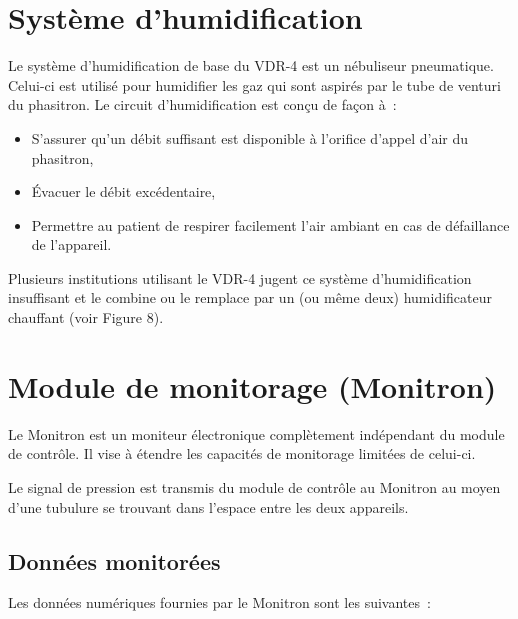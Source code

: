 \section{Système d’humidification}

Le système d’humidification de base du VDR-4 est un nébuliseur pneumatique. Celui-ci est utilisé pour humidifier les gaz qui sont aspirés par le tube de venturi du phasitron. Le circuit d’humidification est conçu de façon à :

\begin{itemize}
	\item S’assurer qu’un débit suffisant est disponible à l’orifice d’appel d’air du phasitron,
	\item Évacuer le débit excédentaire,
	\item Permettre au patient de respirer facilement l’air ambiant en cas de défaillance de l’appareil.
\end{itemize}

Plusieurs institutions utilisant le VDR-4 jugent ce système d’humidification insuffisant et le combine ou le remplace par un (ou même deux) humidificateur chauffant (voir Figure 8).



\section{Module de monitorage (Monitron)}

Le Monitron est un moniteur électronique complètement indépendant du module de contrôle. Il vise à étendre les capacités de monitorage limitées de celui-ci.

Le signal de pression est transmis du module de contrôle au Monitron au moyen d’une tubulure se trouvant dans l’espace entre les deux appareils.

\subsection{Données monitorées}

Les données numériques fournies par le Monitron sont les suivantes :

